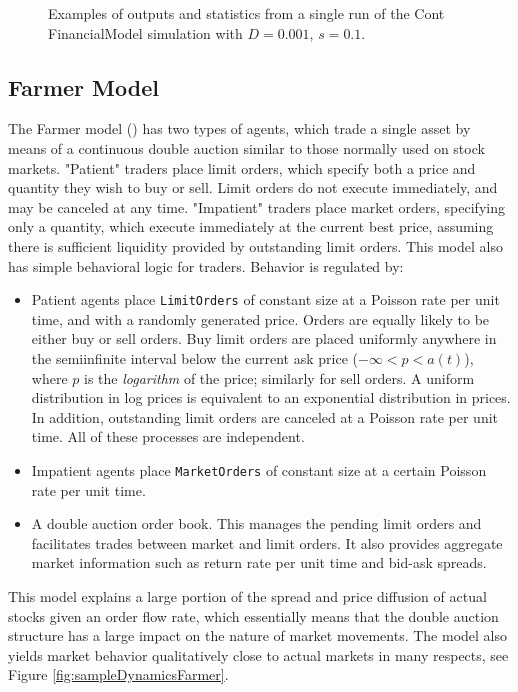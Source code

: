\documentclass[runningheads]{llncs}
\begin{document}
\begin{figure}[htbp]
\begin{center}
{      }
    \caption{Examples of outputs and statistics from a single run of the Cont FinancialModel simulation with $D=0.001$, $s=0.1$.}
    \label{fig:ContLargeSSim}
  \end{center}
\end{figure}


\subsection{Farmer Model}

The Farmer model (\cite{farmer2003}) has two types of agents, which trade a single asset by means of a continuous double auction similar to those normally used on stock markets. "Patient" traders place limit orders, which specify both a price and quantity they wish to buy or sell. Limit orders do not execute immediately, and may be canceled at any time. "Impatient" traders place market orders, specifying only a quantity, which execute immediately at the current best price, assuming there is sufficient liquidity provided by outstanding limit orders. This model also has simple behavioral logic for traders. Behavior is regulated by:
\begin{itemize}
\item Patient agents place \texttt{LimitOrders} of constant size at a Poisson rate per unit time, and with a randomly generated price. Orders are equally likely to be either buy or sell orders. Buy limit orders are placed uniformly anywhere in the semiinfinite interval below the current ask price ($-\infty < p < a(t)$), where $p$ is the \emph{logarithm} of the price; similarly for sell orders. A uniform distribution in log prices is equivalent to an exponential distribution in prices. In addition, outstanding limit orders are canceled at a Poisson rate per unit time. All of these processes are independent.
\item Impatient agents place \texttt{MarketOrders} of constant size at a certain Poisson rate per unit time.
\item A double auction order book. This manages the pending limit orders and facilitates trades between market and limit orders. It also provides aggregate market information such as return rate per unit time and bid-ask spreads.
\end{itemize}
This model explains a large portion of the spread and price diffusion of actual stocks given an order flow rate, which essentially means that the double auction structure has a large impact on the nature of market movements. The model also yields market behavior qualitatively close to actual markets in many respects, see Figure \ref{fig:sampleDynamicsFarmer}.
\end{document}
